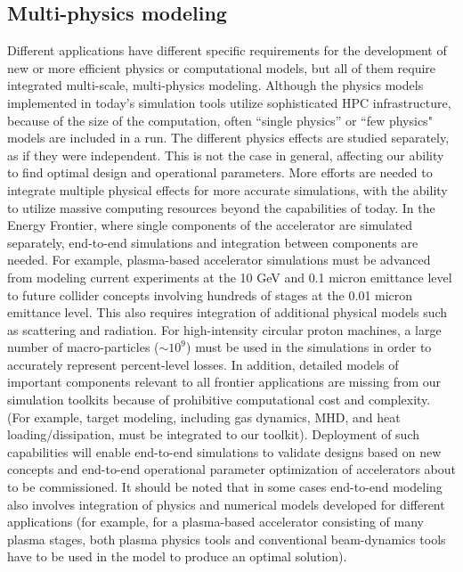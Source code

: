 \subsection{Multi-physics modeling}
 Different applications have different specific
requirements for the development of new or more efficient physics
or computational models, but all of them require integrated
multi-scale, multi-physics modeling.  
Although the physics models implemented in today's simulation tools utilize sophisticated HPC infrastructure, because of the size of the computation, often ``single physics'' or ``few physics" models are included in a run. 
The different physics effects are studied separately, as if they were independent.  
This is not the case in general, affecting our ability to find optimal design and operational parameters.  
More efforts are needed to integrate multiple physical effects for more accurate simulations, with the ability to utilize massive computing resources beyond the capabilities of today. 
   In the Energy Frontier, where single components of the accelerator are simulated separately, end-to-end simulations and integration between components are needed.  For example, plasma-based accelerator simulations must be advanced from modeling current experiments at the 10 GeV and 0.1 micron emittance level to future collider concepts involving hundreds of stages at the 0.01 micron emittance level. 
This also requires integration of additional physical models such as scattering and radiation. For high-intensity circular proton machines, a large number of macro-particles ($\sim 10^9$) must be used in the simulations in order to accurately represent percent-level losses. In addition, detailed models of important components relevant to all frontier applications are missing from our simulation toolkits because of prohibitive computational cost and complexity.
(For example, target modeling, including gas dynamics, MHD, and heat loading/dissipation, must be integrated to our toolkit). 
Deployment of such capabilities
will enable end-to-end simulations to validate designs based on
new concepts and end-to-end operational parameter optimization of
accelerators about to be commissioned.  It should be noted that
in some cases end-to-end modeling also involves integration of physics
and numerical models developed for different applications (for
example, for a plasma-based accelerator consisting of many plasma
stages, both plasma physics tools and conventional beam-dynamics
tools have to be used in the model to produce an optimal
solution).

